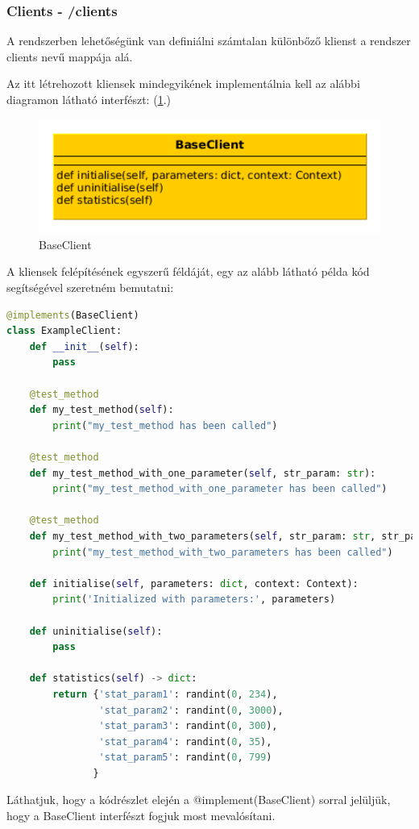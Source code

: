 \documentclass[a4paper,12pt,oneside]{report}
\begin{document}
\subsubsection{Clients - /clients}

A rendszerben lehetőségünk van definiálni számtalan különbőző klienst a rendszer clients nevű mappája alá.

Az itt létrehozott kliensek mindegyikének implementálnia kell az alábbi diagramon látható interfészt: (\ref{fig:baseclient}.)

\begin{figure}[h]
  \includegraphics[width=13cm, keepaspectratio]{baseclient.png}
  \caption{BaseClient}
  \label{fig:baseclient}
\end{figure}

\newpage
A kliensek felépítésének egyszerű féldáját, egy az alább látható példa kód segítségével szeretném bemutatni:


\begin{lstlisting}[language=Python]
@implements(BaseClient)
class ExampleClient:
    def __init__(self):
        pass

    @test_method
    def my_test_method(self):
        print("my_test_method has been called")

    @test_method
    def my_test_method_with_one_parameter(self, str_param: str):
        print("my_test_method_with_one_parameter has been called")

    @test_method
    def my_test_method_with_two_parameters(self, str_param: str, str_param2: str):
        print("my_test_method_with_two_parameters has been called")

    def initialise(self, parameters: dict, context: Context):
        print('Initialized with parameters:', parameters)

    def uninitialise(self):
        pass

    def statistics(self) -> dict:
        return {'stat_param1': randint(0, 234),
                'stat_param2': randint(0, 3000),
                'stat_param3': randint(0, 300),
                'stat_param4': randint(0, 35),
                'stat_param5': randint(0, 799)
               }
\end{lstlisting}
\newpage
Láthatjuk, hogy a kódrészlet elején a @implement(BaseClient) sorral jelüljük, hogy a BaseClient interfészt fogjuk most mevalósítani.
\end{document}
